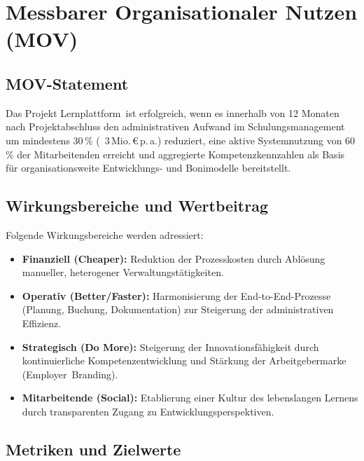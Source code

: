 
\chapter{Messbarer Organisationaler Nutzen (\ac{MOV})}
\label{chap:mov}

\section{\ac{MOV}-Statement}
\label{sec:mov-statement}

Das Projekt \glqq Lernplattform\grqq\  ist erfolgreich, wenn es innerhalb von 12 Monaten
nach Projektabschluss den administrativen Aufwand im Schulungsmanagement um
mindestens 30\,\% (~3\,Mio.\,€\,p.\,a.) reduziert, eine aktive Systemnutzung
von 60\,\% der Mitarbeitenden erreicht und aggregierte Kompetenzkennzahlen als
Basis für organisationsweite Entwicklungs- und Bonimodelle bereitstellt.

\section{Wirkungsbereiche und Wertbeitrag}
\label{sec:mov-wirkungsbereiche}

Folgende Wirkungsbereiche werden adressiert:

\begin{itemize}
    \item \textbf{Finanziell (Cheaper):} Reduktion der Prozesskosten durch
    Ablösung manueller, heterogener Verwaltungstätigkeiten.

    \item \textbf{Operativ (Better/Faster):} Harmonisierung der End-to-End-Prozesse
    (Planung, Buchung, Dokumentation) zur Steigerung der administrativen Effizienz.

    \item \textbf{Strategisch (Do More):} Steigerung der Innovationsfähigkeit durch
    kontinuierliche Kompetenzentwicklung und Stärkung der Arbeitgebermarke
    (Employer~Branding).

    \item \textbf{Mitarbeitende (Social):} Etablierung einer Kultur des lebenslangen
    Lernens durch transparenten Zugang zu Entwicklungsperspektiven.
\end{itemize}

\section{Metriken und Zielwerte}
\label{sec:mov-metriken}

